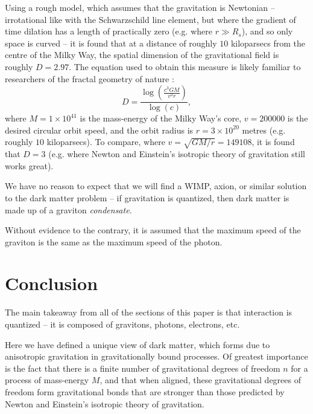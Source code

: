\documentclass[12pt]{article}
\begin{document}
{Using a rough model, which assumes that the gravitation is Newtonian -- irrotational like with the Schwarzschild line element, but where the gradient of time dilation has a length of practically zero (e.g. where $r \gg R_s$), and so only space is curved -- it is found that at a distance of roughly $10$ kiloparsecs from the centre of the Milky Way, the spatial dimension of the gravitational field is roughly $D = 2.97$.
The equation used to obtain this measure is likely familiar to researchers of the fractal geometry of nature \cite{mandelbrot}:
\begin{equation}
D = \frac{ \log\left(\frac{c^3 G M}{ v^2 r } \right)} { \log(c) },
\end{equation}
where $M = 1 \times 10^{41}$ is the mass-energy of the Milky Way's core, $v = 200000$ is the desired circular orbit speed, and the orbit radius is $r = 3 \times 10^{20}$ metres (e.g. roughly $10$ kiloparsecs).
To compare, where $v = \sqrt{GM/r} = 149108$, it is found that $D = 3$ (e.g. where Newton and Einstein's isotropic theory of gravitation still works great).

We have no reason to expect that we will find a WIMP, axion, or similar solution \cite{berger, aalbers, quiskamp, haipeng, hui, ackerman} to the dark matter problem -- if gravitation is quantized, then dark matter is made up of a graviton {\textit{condensate}}.

Without evidence to the contrary, it is assumed that the maximum speed of the graviton is the same as the maximum speed of the photon.






\section{Conclusion}

The main takeaway from all of the sections of this paper is that interaction is quantized -- it is composed of gravitons, photons, electrons, etc. 

Here we have defined a unique view of dark matter, which forms due to anisotropic gravitation in gravitationally bound processes.
Of greatest importance is the fact that there is a finite number of gravitational degrees of freedom $n$ for a process of mass-energy $M$, and that when aligned, these gravitational degrees of freedom form gravitational bonds that are stronger than those predicted by Newton and Einstein's isotropic theory of gravitation.

}
\end{document}
